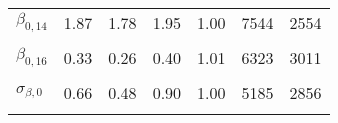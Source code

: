 \begin{table}
\begin{tabular}[t]{lrrrrrr}
$\beta_{0, 14}$ & 1.87 & 1.78 & 1.95 & 1.00 & 7544 & 2554\\
\cellcolor{gray!6}{$\beta_{0, 15}$} & \cellcolor{gray!6}{0.81} & \cellcolor{gray!6}{0.74} & \cellcolor{gray!6}{0.87} & \cellcolor{gray!6}{1.00} & \cellcolor{gray!6}{6948} & \cellcolor{gray!6}{2616}\\
$\beta_{0, 16}$ & 0.33 & 0.26 & 0.40 & 1.01 & 6323 & 3011\\
\cellcolor{gray!6}{$\mu_{\beta, 0}$} & \cellcolor{gray!6}{0.73} & \cellcolor{gray!6}{0.46} & \cellcolor{gray!6}{1.00} & \cellcolor{gray!6}{1.00} & \cellcolor{gray!6}{5592} & \cellcolor{gray!6}{3009}\\
$\sigma_{\beta, 0}$ & 0.66 & 0.48 & 0.90 & 1.00 & 5185 & 2856\\
\cellcolor{gray!6}{$\sigma_{y}$} & \cellcolor{gray!6}{0.11} & \cellcolor{gray!6}{0.10} & \cellcolor{gray!6}{0.13} & \cellcolor{gray!6}{1.00} & \cellcolor{gray!6}{4253} & \cellcolor{gray!6}{2588}\\
\bottomrule
\end{tabular}
\end{table}
